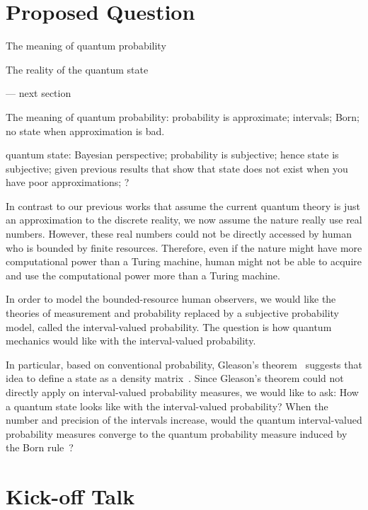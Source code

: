 \documentclass{article}
\theoremstyle{remark}
\begin{document}
\section{Proposed Question}

The meaning of quantum probability 

The reality of the quantum state 

--- next section

The meaning of quantum probability: probability is approximate;
intervals; Born; no state when approximation is bad.

quantum state: Bayesian perspective; probability is subjective; hence
state is subjective; given previous results that show that state does
not exist when you have poor approximations; ?


In contrast to our previous works that assume the current quantum
theory is just an approximation to the discrete reality, we now assume
the nature really use real numbers. However, these real numbers could
not be directly accessed by human who is bounded by finite resources.
Therefore, even if the nature might have more computational power
than a Turing machine, human might not be able to acquire and use
the computational power more than a Turing machine.

In order to model the bounded-resource human observers, we would like
the theories of measurement and probability replaced by a subjective
probability model, called the interval-valued probability. The question
is how quantum mechanics would like with the interval-valued probability.

In particular, based on conventional probability, Gleason's theorem~\cite{gleason1957,Redhead1987-REDINA,peres1995quantum}
suggests that idea to define a state as a density matrix~\cite{Varadarajan2008}.
Since Gleason's theorem could not directly apply on interval-valued
probability measures, we would like to ask: How a quantum state looks
like with the interval-valued probability? When the number and precision
of the intervals increase, would the quantum interval-valued probability
measures converge to the quantum probability measure induced by the
Born rule~\cite{Born1983,Mermin2007,Jaeger2007}?

\section{Kick-off Talk}
\end{document}

